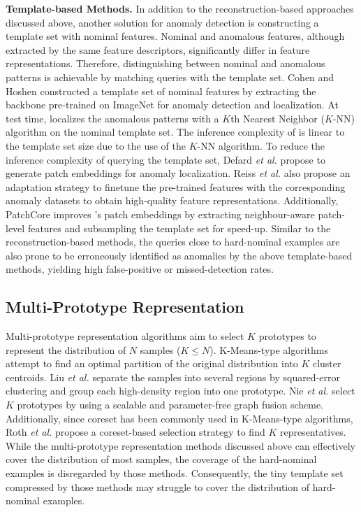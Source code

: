 \documentclass[default,iicol]{sn-jnl}\usepackage[algo2e,ruled,linesnumbered]{algorithm2e}
\theoremstyle{thmstyleone}\newtheorem{theorem}{Theorem}\newtheorem{proposition}[theorem]{Proposition}
\theoremstyle{thmstyletwo}\newtheorem{example}{Example}\newtheorem{remark}{Remark}
\theoremstyle{thmstylethree}\newtheorem{definition}{Definition}
\begin{document}
\noindent\textbf{Template-based Methods. }
In addition to the reconstruction-based approaches discussed above, another solution for anomaly detection is constructing a template set with nominal features.
Nominal and anomalous features, although extracted by the same feature descriptors, significantly differ in feature representations.
Therefore, distinguishing between nominal and anomalous patterns is achievable by matching queries with the template set.
Cohen and Hoshen \cite{SPADE} constructed a template set of nominal features by extracting the backbone pre-trained on ImageNet \cite{imagenet} for anomaly detection and localization.
At test time, \cite{SPADE} localizes the anomalous patterns with a $K$th Nearest Neighbor ($K$-NN) algorithm on the nominal template set.
The inference complexity of \cite{SPADE} is linear to the template set size due to the use of the $K$-NN algorithm.
To reduce the inference complexity of querying the template set, Defard \emph{et al.} \cite{Padim} propose to generate patch embeddings for anomaly localization.
Reiss \emph{et al.} \cite{PANDA} also propose an adaptation strategy to finetune the pre-trained features with the corresponding anomaly datasets to obtain high-quality feature representations.
Additionally, PatchCore \cite{patchcore} improves \cite{Padim}'s patch embeddings by extracting neighbour-aware patch-level features and subsampling the template set for speed-up.
Similar to the reconstruction-based methods, the queries close to hard-nominal examples are also prone to be erroneously identified as anomalies by the above template-based methods, yielding high false-positive or missed-detection rates.

\subsection{Multi-Prototype Representation}
Multi-prototype representation algorithms aim to select $K$ prototypes to represent the distribution of $N$ samples ($K\le N$).
K-Means-type algorithms \cite{kmeans,fuzzy} attempt to find an optimal partition of the original distribution into $K$ cluster centroids.
Liu \emph{et al.} \cite{mpc1} separate the samples into several regions by squared-error clustering and group each high-density region into one prototype.
Nie \emph{et al.} \cite{Nie} select $K$ prototypes by using a scalable and parameter-free graph fusion scheme.
Additionally, since coreset \cite{coreset} has been commonly used in K-Means-type algorithms, Roth \emph{et al.} \cite{patchcore} propose a coreset-based selection strategy to find $K$ representatives.
While the multi-prototype representation methods discussed above can effectively cover the distribution of most samples, the coverage of the hard-nominal examples is disregarded by those methods.
Consequently, the tiny template set compressed by those methods may struggle to cover the distribution of hard-nominal examples.
\end{document}
